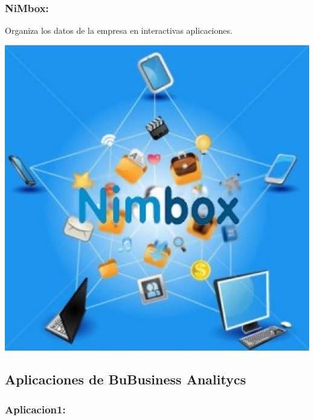 \subsubsection{NiMbox: }\label{sec:nada2}  
Organiza los datos de la empresa en interactivas aplicaciones.
	\begin{center}
	\includegraphics[width=15cm]{./Imagenes/BIimagen20}
	\end{center}


\subsection{Aplicaciones de BuBusiness Analitycs } \label{sec:nada}


\subsubsection{Aplicacion1: }\label{sec:nada2}  

